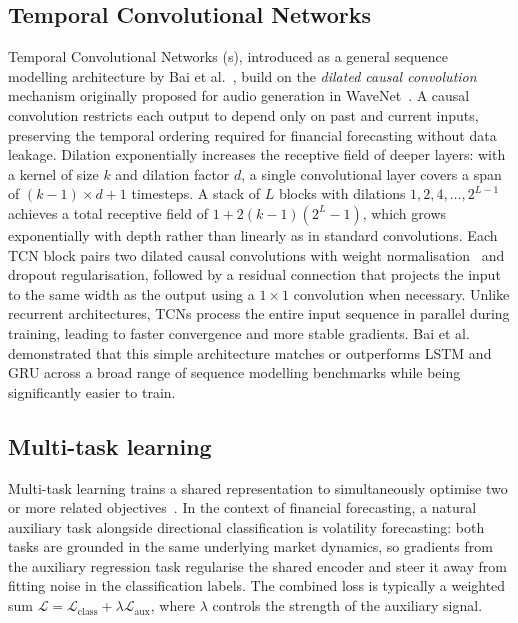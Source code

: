 \subsection{Temporal Convolutional Networks}
Temporal Convolutional Networks (s), introduced as a general sequence modelling architecture by Bai et al.~\cite{bai2018empirical}, build on the \textit{dilated causal convolution} mechanism originally proposed for audio generation in WaveNet~\cite{oord2016wavenet}. A causal convolution restricts each output to depend only on past and current inputs, preserving the temporal ordering required for financial forecasting without data leakage. Dilation exponentially increases the receptive field of deeper layers: with a kernel of size $k$ and dilation factor $d$, a single convolutional layer covers a span of $(k-1) \times d + 1$ timesteps. A stack of $L$ blocks with dilations $1, 2, 4, \ldots, 2^{L-1}$ achieves a total receptive field of $1 + 2(k-1)(2^L - 1)$, which grows exponentially with depth rather than linearly as in standard convolutions. Each TCN block pairs two dilated causal convolutions with weight normalisation~\cite{salimans2016weight} and dropout regularisation, followed by a residual connection that projects the input to the same width as the output using a $1{\times}1$ convolution when necessary. Unlike recurrent architectures, TCNs process the entire input sequence in parallel during training, leading to faster convergence and more stable gradients. Bai et al.~\cite{bai2018empirical} demonstrated that this simple architecture matches or outperforms LSTM and GRU across a broad range of sequence modelling benchmarks while being significantly easier to train.

\subsection{Multi-task learning}
Multi-task learning trains a shared representation to simultaneously optimise two or more related objectives~\cite{zhang2024deep}. In the context of financial forecasting, a natural auxiliary task alongside directional classification is volatility forecasting: both tasks are grounded in the same underlying market dynamics, so gradients from the auxiliary regression task regularise the shared encoder and steer it away from fitting noise in the classification labels. The combined loss is typically a weighted sum $\mathcal{L} = \mathcal{L}_{\text{class}} + \lambda \mathcal{L}_{\text{aux}}$, where $\lambda$ controls the strength of the auxiliary signal.

